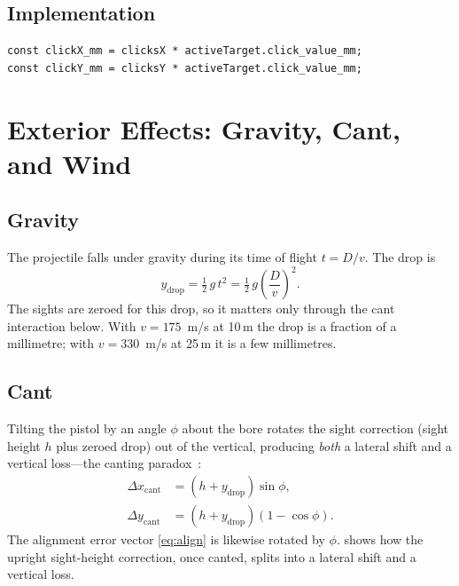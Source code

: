 \documentclass[11pt]{article}
\begin{document}
\subsection{Implementation}

\begin{lstlisting}
const clickX_mm = clicksX * activeTarget.click_value_mm;
const clickY_mm = clicksY * activeTarget.click_value_mm;
\end{lstlisting}

\section{Exterior Effects: Gravity, Cant, and Wind}\label{sec:exterior}

\subsection{Gravity}

The projectile falls under gravity during its time of flight $t = D/v$.
The drop is~\cite{mccoy}
\begin{equation}
  y_{\text{drop}} = \tfrac{1}{2}\,g\,t^2 = \tfrac{1}{2}\,g\left(\frac{D}{v}\right)^2 .
\end{equation}
The sights are zeroed for this drop, so it matters only through the cant
interaction below.  With $v=175$~m/s at 10\,m the drop is a fraction of a
millimetre; with $v=330$~m/s at 25\,m it is a few millimetres.

\subsection{Cant}

Tilting the pistol by an angle $\phi$ about the bore rotates the sight
correction (sight height $h$ plus zeroed drop) out of the vertical,
producing \emph{both} a lateral shift and a vertical loss---the canting
paradox~\cite{rinker}:
\begin{align}
  \Delta x_{\text{cant}} &= (h + y_{\text{drop}})\sin\phi,\\
  \Delta y_{\text{cant}} &= (h + y_{\text{drop}})(1-\cos\phi).
\end{align}
The alignment error vector \eqref{eq:align} is likewise rotated by $\phi$.
 shows how the upright sight-height correction, once
canted, splits into a lateral shift and a vertical loss.
\end{document}
